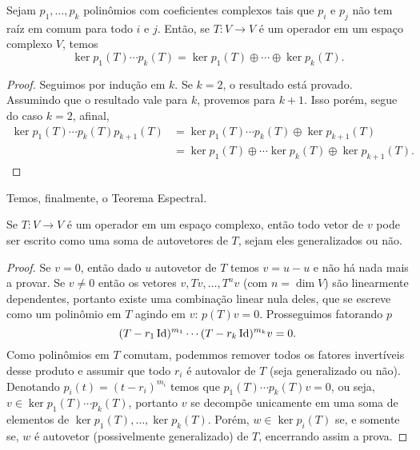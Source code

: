\begin{lemma}
    Sejam $p_1, \dots, p_k$ polinômios com coeficientes complexos tais que $p_i$ e $p_j$ não tem raíz em comum para todo $i$ e $j$. Então, se $T \colon V \to V$ é um operador em um espaço complexo $V$, temos \begin{equation}
        \ker p_1(T) \cdots p_k(T) = \ker p_1(T) \oplus \cdots \oplus \ker p_k(T).
    \end{equation}
\end{lemma}
\begin{proof}
    Seguimos por indução em $k$. Se $k = 2$, o resultado está provado. Assumindo que o resultado vale para $k$, provemos para $k + 1$. Isso porém, segue do caso $k = 2$, afinal, \begin{align}
        \ker p_1(T) \cdots p_k(T) p_{k+1}(T) &= \ker p_1(T) \cdots p_k(T) \oplus \ker p_{k+1}(T) \\ &= \ker p_1(T) \oplus \cdots \ker p_k(T) \oplus \ker p_{k + 1}(T).
    \end{align}
\end{proof}

Temos, finalmente, o Teorema Espectral.

\begin{theorem}
    Se $T \colon V \to V$ é um operador em um espaço complexo, então todo vetor de $v$ pode ser escrito como uma soma de autovetores de $T$, sejam eles generalizados ou não.
\end{theorem}
\begin{proof}
    Se $v = 0$, então dado $u$ autovetor de $T$ temos $v = u - u$ e não há nada mais a provar. Se $v \neq 0$ então os vetores $v, Tv, \dots, T^nv$ (com $n = \dim V$) são linearmente dependentes, portanto existe uma combinação linear nula deles, que se escreve como um polinômio em $T$ agindo em $v$: $p(T)v = 0$. Prosseguimos fatorando $p$ \begin{equation}
        (T - r_1\operatorname{Id})^{m_1} \cdots (T - r_k\operatorname{Id})^{m_k}v = 0.
    \end{equation} Como polinômios em $T$ comutam, podemmos remover todos os fatores invertíveis desse produto e assumir que todo $r_i$ é autovalor de $T$ (seja generalizado ou não). Denotando $p_i(t) = (t - r_i)^{m_i}$ temos que $p_1(T) \cdots p_k(T)v = 0$, ou seja, $v \in \ker p_1(T) \cdots p_k(T)$, portanto $v$ se decompõe unicamente em uma soma de elementos de $\ker p_1(T), \dots, \ker p_k(T)$. Porém, $w \in \ker p_i(T)$ se, e somente se, $w$ é autovetor (possivelmente generalizado) de $T$, encerrando assim a prova.
\end{proof}

